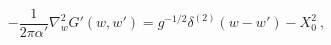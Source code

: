 \begin{equation}
   -\frac{1}{2\pi\alpha'}\nabla^2_w G'(w,w') = g^{-1/2}\delta^{(2)}(w-w')-X^2_0 \ ,
\label{gfeqn}
\end{equation}

